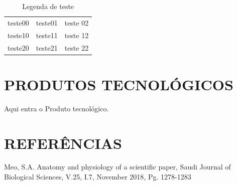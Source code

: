 \documentclass[
12pt,		%
openright,	%
twoside,  %
a4paper,			%
chapter=TITLE,		%
english,			%
french,				%
spanish,			%
brazil				%
]{USPSC-classe/USPSC_RedarTex}
\begin{document}
\begin{table}[htb]
\tiny
\caption{\label{e1fee5245f1f580d36a53669e2e1e0d16ec34593}Legenda de teste}

\centering
\begin{tabular}{|c|c|c|}
\hline
teste00  &  teste01  &  teste 02 \\
teste10  &  teste11  &  teste 12 \\
teste20  &  teste21  &  teste 22 \\
\hline
\end{tabular}
\end{table}


\chapter[PRODUTOS TECNOL\'OGICOS]{PRODUTOS TECNOL\'OGICOS}\label{PRODUTOS TECNOL\'OGICOS}
Aqui entra o Produto tecnol\'ogico.










\chapter[REFER\^ENCIAS]{REFER\^ENCIAS}\label{REFER\^ENCIAS}
\begin{flushleft}
\begin{flushleft}
\begin{flushleft}
\begin{flushleft}
\begin{flushleft}
\begin{flushleft}
\begin{flushleft}
\begin{flushleft}
\begin{flushleft}
\begin{flushleft}
[MEO, 2018] Meo, S.A. Anatomy and physiology of a scientific paper, Saudi Journal of Biological Sciences, V.25, I.7, November 2018, Pg. 1278-1283
\end{flushleft}


\end{flushleft}


\end{flushleft}


\end{flushleft}


\end{flushleft}


\end{flushleft}


\end{flushleft}


\end{flushleft}


\end{flushleft}


\end{flushleft}
\end{document}
